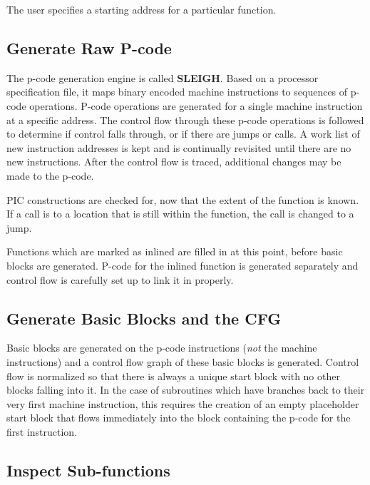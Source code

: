 The user specifies a starting address for a particular function.\hypertarget{index_step1}{}\subsection{Generate Raw P-\/code}\label{index_step1}
The p-\/code generation engine is called {\bfseries{S\+L\+E\+I\+GH}}. Based on a processor specification file, it maps binary encoded machine instructions to sequences of p-\/code operations. P-\/code operations are generated for a single machine instruction at a specific address. The control flow through these p-\/code operations is followed to determine if control falls through, or if there are jumps or calls. A work list of new instruction addresses is kept and is continually revisited until there are no new instructions. After the control flow is traced, additional changes may be made to the p-\/code.


\begin{DoxyEnumerate}
\item P\+IC constructions are checked for, now that the extent of the function is known. If a call is to a location that is still within the function, the call is changed to a jump.
\item Functions which are marked as inlined are filled in at this point, before basic blocks are generated. P-\/code for the inlined function is generated separately and control flow is carefully set up to link it in properly.
\end{DoxyEnumerate}\hypertarget{index_step2}{}\subsection{Generate Basic Blocks and the C\+FG}\label{index_step2}
Basic blocks are generated on the p-\/code instructions ({\itshape not} the machine instructions) and a control flow graph of these basic blocks is generated. Control flow is normalized so that there is always a unique start block with no other blocks falling into it. In the case of subroutines which have branches back to their very first machine instruction, this requires the creation of an empty placeholder start block that flows immediately into the block containing the p-\/code for the first instruction.\hypertarget{index_step3}{}\subsection{Inspect Sub-\/functions}\label{index_step3}

